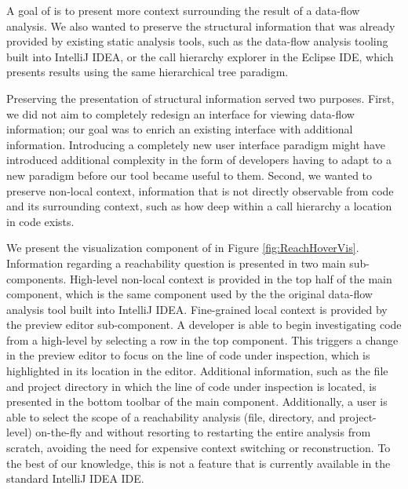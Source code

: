 \noindent A goal of \toolname{} is to present more context surrounding the 
result of a data-flow analysis. 
We also wanted to preserve the structural information that was
already provided by existing static analysis tools, such as the data-flow
analysis tooling built into IntelliJ IDEA, or the call hierarchy explorer in
the Eclipse \ac{IDE}, which presents results using the same hierarchical
tree paradigm.

\par Preserving the presentation of structural information served two purposes.
First, we did not aim to completely redesign an interface for viewing data-flow
information;
our goal was to enrich an existing interface with additional information.
Introducing a completely new user interface paradigm might have introduced
additional complexity in the form of developers having to adapt to a new 
paradigm before our tool became useful to them.
Second, we wanted to preserve non-local context, \ie information that is not
directly observable from code and its surrounding context, such as how deep
within a call hierarchy a location in code exists.

\par We present the visualization component of \toolname{} in Figure
\ref{fig:ReachHoverVis}.
Information regarding a reachability question is presented in two main
sub-components.
High-level non-local context is provided in the top half of the main component,
which is the same component used by the the original data-flow analysis tool
built into IntelliJ IDEA.
Fine-grained local context is provided by the preview editor sub-component.
A developer is able to begin investigating code from a high-level by selecting
a row in the top component.
This triggers a change in the preview editor to focus on the line of code under
inspection, which is highlighted in its location in the editor.
Additional information, such as the file and project directory in which the
line of code under inspection is located, is presented in the bottom
toolbar of the main component.
Additionally, a user is able to select the scope of a reachability analysis
(\ie file, directory, and project-level) on-the-fly and without resorting to 
restarting the entire analysis from scratch, avoiding the need for expensive
context switching or reconstruction.
To the best of our knowledge, this is not a feature that is currently available
in the standard IntelliJ IDEA \ac{IDE}.

